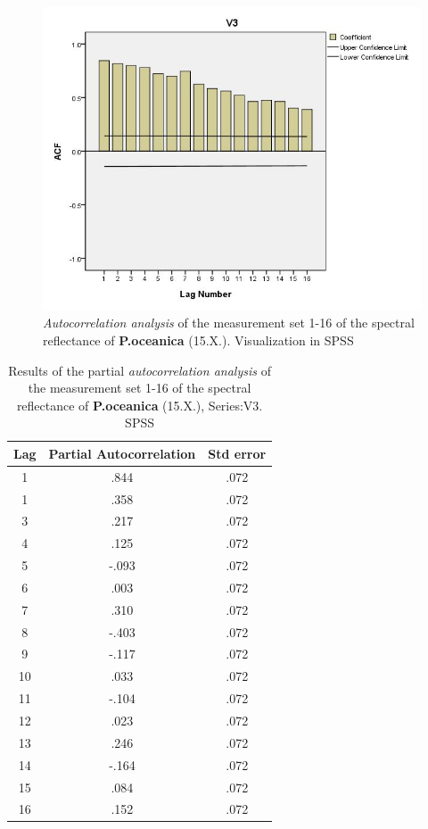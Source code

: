 \documentclass[10pt, a4paper]{article}
\begin{document}
\begin{appendices}
\begin{figure}[H]
\centering
\includegraphics[scale=0.45]{Autocorr.jpg}
\caption{\textit{Autocorrelation analysis} of the measurement set 1-16 of the spectral reflectance of \textbf{P.oceanica} (15.X.). Visualization in SPSS}
\label{fig:50}
\end{figure}
\pagebreak
\newpage

\begin{table}[htbp]
\caption{Results of the partial \textit{autocorrelation analysis} of the measurement set 1-16 of the spectral reflectance of \textbf{P.oceanica} (15.X.), Series:V3. SPSS}
\label{tab:12}
\begin{center}
\begin{tabular}{|c|c|c|}
\hline\hline
Lag & Partial Autocorrelation & Std error\\ \hline\hline
1 & .844 & .072 \\ \hline
1 &.358 & .072 \\ \hline
3 & .217 &.072 \\ \hline
4 & .125 &.072 \\ \hline
5 & -.093 & .072 \\ \hline
6 & .003 & .072 \\ \hline
7 & .310 & .072 \\ \hline
8 & -.403 & .072 \\ \hline
9 & -.117 & .072 \\ \hline
10 & .033 & .072 \\ \hline
11 & -.104 & .072 \\ \hline
12 & .023 &.072 \\ \hline
13 & .246 &.072 \\ \hline
14 & -.164 & .072 \\ \hline
15 & .084 & .072 \\ \hline
16 & .152 & .072 \\ \hline
\end{tabular}
\end{center}
\end{table}


\end{appendices}
\end{document}
